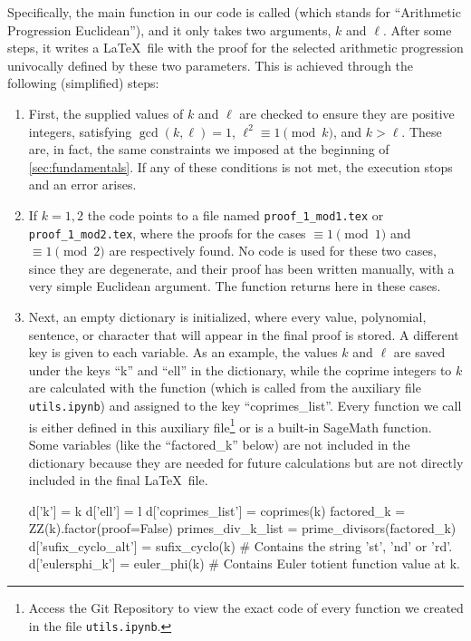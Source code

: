 \documentclass[../main.tex]{subfiles}
\begin{document}
Specifically, the main function in our code is called \textcolor{blue}{} (which stands for ``Arithmetic Progression Euclidean''), and it only takes two arguments, $k$ and $\ell$. After some steps, it writes a \LaTeX \ file with the proof for the selected arithmetic progression univocally defined by these two parameters. This is achieved through the following (simplified) steps:
\begin{enumerate}
	\item First, the supplied values of $k$ and $\ell$ are checked to ensure they are positive integers, satisfying $\gcd(k, \ell)=1$, $\ell^2\equiv 1 \pmod{k}$, and $k>\ell$. These are, in fact, the same constraints we imposed at the beginning of \cref{sec:fundamentals}. If any of these conditions is not met, the execution stops and an error arises.
	\item If $k=1,2$ the code points to a file named \texttt{proof\_1\_mod1.tex} or \texttt{proof\_1\_mod2.tex}, where the proofs for the cases $\equiv 1 \pmod{1}$ and $\equiv 1 \pmod{2}$ are respectively found. No code is used for these two cases, since they are degenerate, and their proof has been written manually, with a very simple Euclidean argument. The function \textcolor{blue}{} returns here in these cases.
	\item Next, an empty dictionary is initialized, where every value, polynomial, sentence, or character that will appear in the final proof is stored. A different key is given to each variable. As an example, the values $k$ and $\ell$ are saved under the keys ``k'' and ``ell'' in the dictionary, while the coprime integers to $k$ are calculated with the function \textcolor{blue}{} (which is called from the auxiliary file \texttt{utils.ipynb}) and assigned to the key ``coprimes\_list''. Every function we call is either defined in this auxiliary file\footnote{Access the Git Repository to view the exact code of every function we created in the file \texttt{utils.ipynb}.} or is a built-in SageMath function. Some variables (like the ``factored\_k'' below) are not included in the dictionary because they are needed for future calculations but are not directly included in the final \LaTeX \ file.\\
	
	\begin{python}
		
		d['k'] = k
		d['ell'] = l
		d['coprimes_list'] = coprimes(k)
		factored_k = ZZ(k).factor(proof=False)
		primes_div_k_list = prime_divisors(factored_k)
		d['sufix_cyclo_alt'] = sufix_cyclo(k) # Contains the string    'st', 'nd' or 'rd'.
		d['eulersphi_k'] = euler_phi(k) # Contains Euler totient function value at k.
	\end{python}
	

\end{enumerate}
\end{document}
